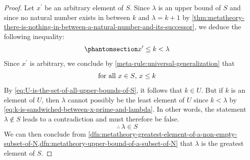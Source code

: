 \begin{proof}
    \vspace{0.3cm}
    \noindent
    Let \( x^{\prime} \) be an arbitrary element of \( S \).
    Since \( \lambda \) is an upper bound of \( S \) and since no natural number exists in between
    \( k \) and \( \lambda = k + 1 \) by \cref{thm:metatheory-there-is-nothing-in-between-a-natural-number-and-its-successor},
    we deduce the following inequality:
    \begin{equation}
        \phantomsection \label{eq:k-is-sandwiched-between-x-prime-and-lambda}
        x^{\prime} \leq k < \lambda
    \end{equation}
    Since \( x^{\prime} \) is arbitrary, we conclude by \cref{meta-rule:universal-generalization} that
    \begin{equation*}
        \text{for all \( x \in S \), \( x \leq k \)}
    \end{equation*}
    By \eqref{eq:U-is-the-set-of-all-upper-bounds-of-S}, it follows that \( k \in U \).
    But if \( k \) is an element of \( U \), then \( \lambda \) cannot possibly be the least element of \( U \) since \( k < \lambda \) by
    \eqref{eq:k-is-sandwiched-between-x-prime-and-lambda}.
    In other words, the statement \( \lambda \notin S \) leads to a contradiction and must therefore be false.
    \begin{equation*}
        \therefore \, \lambda \in S
    \end{equation*}
    We can then conclude from \cref{dfn:metatheory-greatest-element-of-a-non-empty-subset-of-N,dfn:metatheory-upper-bound-of-a-subset-of-N} that
    \( \lambda \) is the greatest element of \( S \).
\end{proof}


